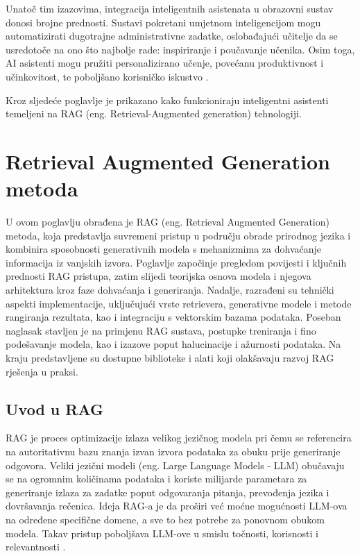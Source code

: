 \documentclass[]{foi}
\begin{document}
Unatoč tim izazovima, integracija inteligentnih asistenata u obrazovni sustav donosi brojne prednosti. Sustavi pokretani umjetnom inteligencijom mogu automatizirati dugotrajne administrativne
zadatke, oslobađajući učitelje da se usredotoče na ono što najbolje rade: inspiriranje i poučavanje učenika. Osim toga, AI asistenti mogu pružiti personalizirano učenje, povećanu produktivnost
i učinkovitost, te poboljšano korisničko iskustvo \cite{weber2025smythos}.

Kroz sljedeće poglavlje je prikazano kako funkcioniraju inteligentni asistenti temeljeni na RAG (eng. Retrieval-Augmented generation) tehnologiji.
\newpage
\chapter{Retrieval Augmented Generation metoda}

U ovom poglavlju obrađena je RAG (eng. Retrieval Augmented Generation) metoda, koja predstavlja suvremeni pristup u području obrade prirodnog jezika i kombinira sposobnosti generativnih modela
s mehanizmima za dohvaćanje informacija iz vanjskih izvora. Poglavlje započinje pregledom povijesti i ključnih prednosti RAG pristupa, zatim slijedi teorijska osnova modela i njegova arhitektura
kroz faze dohvaćanja i generiranja. Nadalje, razrađeni su tehnički aspekti implementacije, uključujući vrste retrievera, generativne modele i metode rangiranja rezultata, kao i integraciju s 
vektorskim bazama podataka. Poseban naglasak stavljen je na primjenu RAG sustava, postupke treniranja i fino podešavanje modela, kao i izazove poput halucinacije i ažurnosti podataka.
Na kraju predstavljene su dostupne biblioteke i alati koji olakšavaju razvoj RAG rješenja u praksi. 

\section{Uvod u RAG}

RAG je proces optimizacije izlaza velikog jezičnog modela pri čemu se referencira na autoritativnu bazu znanja izvan izvora podataka za obuku 
prije generiranje odgovora. Veliki jezični modeli (eng. Large Language Models - LLM) obučavaju se na ogromnim količinama podataka i koriste milijarde parametara za 
generiranje izlaza za zadatke poput odgovaranja pitanja, prevođenja jezika i dovršavanja rečenica. Ideja RAG-a je da proširi već moćne mogućnosti 
LLM-ova na određene specifične domene, a sve to bez potrebe za ponovnom obukom modela. Takav pristup poboljšava LLM-ove u smislu točnosti, 
korisnosti i relevantnosti \cite{awsRAG2025}.
\end{document}
